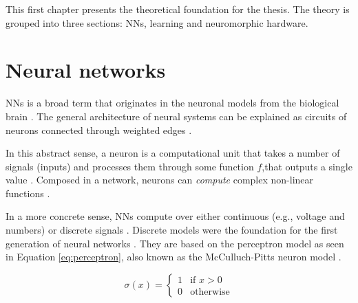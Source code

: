 \documentclass[report.tex]{subfiles}
\begin{document}
This first chapter presents the theoretical foundation for the thesis.
The theory is grouped into three sections: \glspl{NN}, learning and
neuromorphic hardware.

\section{Neural networks} \label{sec:nn}
\Glspl{NN} is a broad term that originates in the neuronal models from
the biological brain \cite{Dayan2001}.
The general architecture of neural systems can be explained as circuits
of neurons  connected through weighted edges
\cite{Russel2007, Dayan2001}.

In this abstract sense, a neuron is a computational unit that
takes a number of signals (inputs) and processes them through some
function $f$,that outputs a single value \cite{Eliasmith2004}.
Composed in a network, neurons can \textit{compute} 
complex non-linear functions \cite{Eliasmith2004, Dayan2001}.

In a more concrete sense, \gls{NN}s compute over either
continuous (e.g., voltage and numbers) or discrete signals
\cite{Russel2007, Schmidhuber2014}.
Discrete models were the foundation for
the first generation of neural networks \cite{Russel2007, Maass1997}.
They are based on the perceptron model as seen in Equation
\ref{eq:perceptron}, also known as the McCulluch-Pitts neuron model
\cite{Eliasmith2004}.

\begin{equation} \label{eq:perceptron}
\sigma(x) = \begin{cases}
	 1 & \text{if } x > 0\\
	 0 & \text{otherwise}
       \end{cases}
\end{equation}
\end{document}
